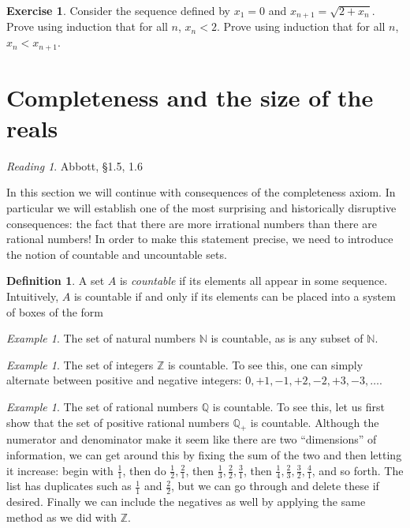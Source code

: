 \documentclass[11pt,oneside]{amsbook}
\newcommand{\NN}{\mathbb N}
\newcommand{\ZZ}{\mathbb Z}
\newcommand{\QQ}{\mathbb Q}
\theoremstyle{definition}
\newtheorem{exerc}{Exercise}[section]
\theoremstyle{plain}
\theoremstyle{definition}
\newtheorem{defn}[thm]{Definition}
\theoremstyle{remark}
\newtheorem{example}[thm]{Example}
\newtheorem*{reading}{Reading}
\numberwithin{equation}{section}
\numberwithin{figure}{section}
\begin{document}
\begin{exerc}
  Consider the sequence defined by $x_1=0$ and $x_{n+1}=\sqrt{2+x_n}$.  Prove using induction that for all $n$, $x_n<2$. Prove using induction that for all $n$, $x_n<x_{n+1}$.
\end{exerc}

\newpage
\section{Completeness and the size of the reals}

\begin{reading}
  Abbott, \S 1.5, 1.6
\end{reading}

In this section we will continue with consequences of the completeness axiom. In particular we will establish one of the most surprising and historically disruptive consequences: the fact that there are more irrational numbers than there are rational numbers! In order to make this statement precise, we need to introduce the notion of countable and uncountable sets.

\begin{defn}
  A set $A$ is \emph{countable} if its elements all appear in some sequence. Intuitively, $A$ is countable if and only if its elements can be placed into a system of boxes of the form
\begin{center}
\end{center}
\end{defn}

\begin{example}
  The set of natural numbers $\NN$ is countable, as is any subset of $\NN$.
\end{example}

\begin{example}
  The set of integers $\ZZ$ is countable. To see this, one can simply alternate between positive and negative integers: $0,+1,-1,+2,-2,+3,-3,\ldots$.
\end{example}

\begin{example}
  The set of rational numbers $\QQ$ is countable. To see this, let us first show that the set of positive rational numbers $\QQ_+$ is countable. Although the numerator and denominator make it seem like there are two ``dimensions'' of information, we can get around this by fixing the sum of the two and then letting it increase: begin with $\frac11$, then do $\frac12,\frac21$, then $\frac13,\frac22,\frac31$, then $\frac14,\frac23,\frac32,\frac41$, and so forth. The list has duplicates such as $\frac11$ and $\frac22$, but we can go through and delete these if desired. Finally we can include the negatives as well by applying the same method as we did with $\ZZ$.
\end{example}
\end{document}
